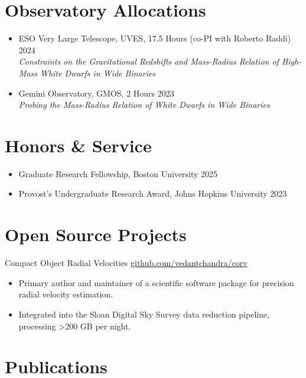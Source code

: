 \documentclass[11pt]{article}       %
\begin{document}
\section*{Observatory Allocations}
\begin{itemize}
  \item ESO Very Large Telescope, UVES, 17.5 Hours (co-PI with Roberto Raddi) \hfill 2024 \\
  \vspace{4pt} \textit{Constraints on the Gravitational Redshifts and Mass-Radius Relation of High-Mass White Dwarfs in Wide Binaries}
  \item Gemini Observatory, GMOS, 2 Hours \hfill 2023 \\
  \vspace{4pt} \textit{Probing the Mass-Radius Relation of White Dwarfs in Wide Binaries}
\end{itemize}

\section{Honors \& Service}
\begin{itemize}
  \item Graduate Research Fellowship, Boston University \hfill 2025
  \item Provost's Undergraduate Research Award, Johns Hopkins University \hfill 2023
\end{itemize}

\section*{Open Source Projects}
Compact Object Radial Velocities \hfill \href{https://github.com/vedantchandra/corv}{github.com/vedantchandra/corv} \\
\vspace{-9pt}
\begin{itemize}
  \item Primary author and maintainer of a scientific software package for precision radial velocity estimation.
  \item Integrated into the Sloan Digital Sky Survey data reduction pipeline, processing >200 GB per night.
\end{itemize}

\section{Publications}
\end{document}
